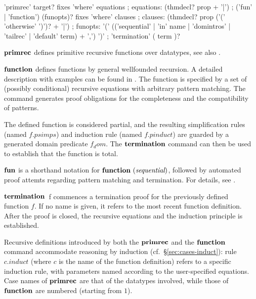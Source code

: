 
\begin{rail}
  'primrec' target? fixes 'where' equations
  ;
  equations: (thmdecl? prop + '|')
  ;
  ('fun' | 'function') (funopts)? fixes 'where' clauses
  ;
  clauses: (thmdecl? prop ('(' 'otherwise' ')')? + '|')
  ;
  funopts: '(' (('sequential' | 'in' name | 'domintros' | 'tailrec' |
  'default' term) + ',') ')'
  ;
  'termination' ( term )?
\end{rail}

\begin{descr}

\item [${\mathord{\mathbf{primrec}}}$] defines primitive recursive functions over
  datatypes, see also \cite{isabelle-HOL}.

\item [${\mathord{\mathbf{function}}}$] defines functions by general
  wellfounded recursion. A detailed description with examples can be
  found in \cite{isabelle-function}. The function is specified by a
  set of (possibly conditional) recursive equations with arbitrary
  pattern matching. The command generates proof obligations for the
  completeness and the compatibility of patterns.

  The defined function is considered partial, and the resulting
  simplification rules (named $f.psimps$) and induction rule (named
  $f.pinduct$) are guarded by a generated domain predicate $f_dom$. 
  The ${\mathord{\mathbf{termination}}}$ command can then be used to establish
  that the function is total.

\item [${\mathord{\mathbf{fun}}}$] is a shorthand notation for
  ${\mathord{\mathbf{function}}}~(\textit{sequential})$, followed by automated
  proof attemts regarding pattern matching and termination. For
  details, see \cite{isabelle-function}.

\item [${\mathord{\mathbf{termination}}}$~f] commences a termination proof
  for the previously defined function $f$. If no name is given, it
  refers to the most recent function definition. After the proof is
  closed, the recursive equations and the induction principle is established.
\end{descr}

Recursive definitions introduced by both the ${\mathord{\mathbf{primrec}}}$
and the ${\mathord{\mathbf{function}}}$ command accommodate reasoning by
induction (cf.\ \S\ref{sec:cases-induct}): rule $c\mathord{.}induct$
(where $c$ is the name of the function definition) refers to a
specific induction rule, with parameters named according to the
user-specified equations.  Case names of ${\mathord{\mathbf{primrec}}}$ are
that of the datatypes involved, while those of
${\mathord{\mathbf{function}}}$ are numbered (starting from $1$).

